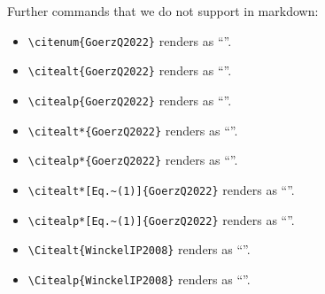 \documentclass[aps,rmp,onecolumn,noshowpacs,superscriptaddress,preprintnumbers,%
kamsmath,amssymb,notitlepage,letterpaper]{revtex4-2}
\begin{document}
Further commands that we do not support in markdown:

\begin{itemize}
  \item \verb|\citenum{GoerzQ2022}| renders as ``''.
  \item \verb|\citealt{GoerzQ2022}| renders as ``\citealt{GoerzQ2022}''.
  \item \verb|\citealp{GoerzQ2022}| renders as ``\citealp{GoerzQ2022}''.
  \item \verb|\citealt*{GoerzQ2022}| renders as ``\citealt*{GoerzQ2022}''.
  \item \verb|\citealp*{GoerzQ2022}| renders as ``\citealp*{GoerzQ2022}''.
  \item \verb|\citealt*[Eq.~(1)]{GoerzQ2022}| renders as ``\citealt*[Eq.~(1)]{GoerzQ2022}''.
  \item \verb|\citealp*[Eq.~(1)]{GoerzQ2022}| renders as ``\citealp*[Eq.~(1)]{GoerzQ2022}''.
  \item \verb|\Citealt{WinckelIP2008}| renders as ``''.
  \item \verb|\Citealp{WinckelIP2008}| renders as ``''.
\end{itemize}



\end{document}
